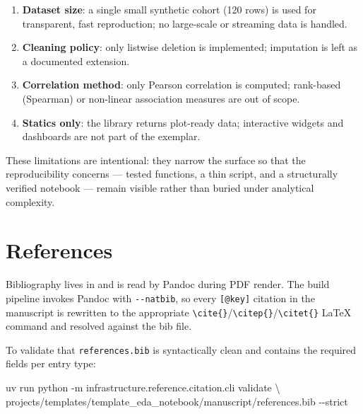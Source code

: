\documentclass[
]{article}
\newenvironment{Shaded}{}{}
\newcommand{\AttributeTok}[1]{\textcolor[rgb]{0.49,0.56,0.16}{#1}}
\newcommand{\DataTypeTok}[1]{\textcolor[rgb]{0.56,0.13,0.00}{#1}}
\newcommand{\ExtensionTok}[1]{#1}
\newcommand{\NormalTok}[1]{#1}
\providecommand{\tightlist}{%
  \setlength{\itemsep}{0pt}\setlength{\parskip}{0pt}}
\begin{document}
\begin{enumerate}
\def\labelenumi{\arabic{enumi}.}
\tightlist
\item
  \textbf{Dataset size}: a single small synthetic cohort (120 rows) is
  used for transparent, fast reproduction; no large-scale or streaming
  data is handled.
\item
  \textbf{Cleaning policy}: only listwise deletion is implemented;
  imputation is left as a documented extension.
\item
  \textbf{Correlation method}: only Pearson correlation is computed;
  rank-based (Spearman) or non-linear association measures are out of
  scope.
\item
  \textbf{Statics only}: the library returns plot-ready data;
  interactive widgets and dashboards are not part of the exemplar.
\end{enumerate}

These limitations are intentional: they narrow the surface so that the
reproducibility concerns --- tested functions, a thin script, and a
structurally verified notebook --- remain visible rather than buried
under analytical complexity.

\newpage

\section{References}\label{sec:references}

Bibliography lives in
\href{references.bib}{} and is read by
Pandoc during PDF render. The build pipeline invokes Pandoc with
\texttt{-\/-natbib}, so every \texttt{{[}@key{]}} citation in the
manuscript is rewritten to the appropriate
\texttt{\textbackslash{}cite\{\}}/\texttt{\textbackslash{}citep\{\}}/\texttt{\textbackslash{}citet\{\}}
LaTeX command and resolved against the bib file.

To validate that \texttt{references.bib} is syntactically clean and
contains the required fields per entry type:

\begin{Shaded}
\begin{Highlighting}[]
\ExtensionTok{uv}\NormalTok{ run python }\AttributeTok{{-}m}\NormalTok{ infrastructure.reference.citation.cli validate }\DataTypeTok{\textbackslash{}}
\NormalTok{    projects/templates/template\_eda\_notebook/manuscript/references.bib }\AttributeTok{{-}{-}strict}
\end{Highlighting}
\end{Shaded}




\clearpage


\end{document}

